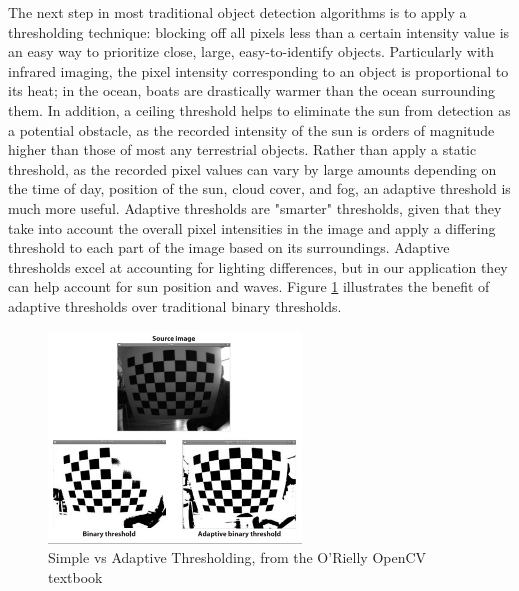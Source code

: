The next step in most traditional object detection algorithms is to apply a thresholding technique: blocking off all pixels less than a certain intensity value is an easy way to prioritize close, large, easy-to-identify objects. Particularly with infrared imaging, the pixel intensity corresponding to an object is proportional to its heat; in the ocean, boats are drastically warmer than the ocean surrounding them. In addition, a ceiling threshold helps to eliminate the sun from detection as a potential obstacle, as the recorded intensity of the sun is orders of magnitude higher than those of most any terrestrial objects. Rather than apply a static threshold, as the recorded pixel values can vary by large amounts depending on the time of day, position of the sun, cloud cover, and fog, an adaptive threshold is much more useful. Adaptive thresholds are "smarter" thresholds, given that they take into account the overall pixel intensities in the image and apply a differing threshold to each part of the image based on its surroundings. Adaptive thresholds excel at accounting for lighting differences, but in our application they can help account for sun position and waves. Figure \ref{fig:thresh_comp} illustrates the benefit of adaptive thresholds over traditional binary thresholds.

\begin{figure}
\centering
\includegraphics[width=0.6\textwidth]{"./image/threshold_comparisons"}
\caption{Simple vs Adaptive Thresholding, from the O'Rielly OpenCV textbook}
\label{fig:thresh_comp}
\end{figure}

